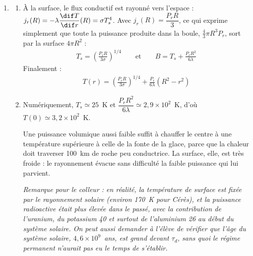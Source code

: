 \begin{correction}
\begin{enumerate}
\begin{enumerate}
	\item On néglige alors $\partial T/\partial t$ :
	\begin{align*}
		\frac{1}{r^2}\frac{\dif }{\dif r}\left( r^2\frac{\dif T}{\dif r}\right) = -\frac{\kappa}{D}=-\frac{P_r}{\lambda}
	\end{align*}
	En intégrant une première fois, $r^2\dfrac{\dif T}{\dif r}=-\dfrac{P_r}{3\lambda}r^3+A$, puis :
	\begin{align*}
		T(r) = -\frac{P_r}{6\lambda}r^2-\frac{A}{r}+B
	\end{align*}
	La température doit rester finie au centre, donc $A=0$. Autre argument : le flux sortant d'une petite sphère de rayon $r$ vaut $4\pi r^2j_r=\frac{4}{3}\pi r^3P_r-4\pi\lambda A$, et doit tendre vers 0 avec le volume de la sphère.

\end{enumerate}

\item

\begin{enumerate}

	\item À la surface, le flux conductif est rayonné vers l'espace : $j_r(R)=-\lambda\dfrac{\dif T}{\dif r}(R)=\sigma T_s^4$. Avec $j_r(R)=\dfrac{P_rR}{3}$, ce qui exprime simplement que toute la puissance produite dans la boule, $\frac{4}{3}\pi R^3P_r$, sort par la surface $4\pi R^2$ :
	\begin{align*}
		T_s=\left(\frac{P_rR}{3\sigma}\right)^{1/4} \qquad\text{et}\qquad B=T_s+\frac{P_rR^2}{6\lambda}
	\end{align*}
	Finalement :
	\begin{align*}
		\boxed{T(r) =\left(\frac{P_rR}{3\sigma}\right)^{1/4}+\frac{P_r}{6\lambda}\left( R^2 - r^2\right)}
	\end{align*}

	\item Numériquement, $T_s\simeq25$~K et $\dfrac{P_rR^2}{6\lambda}\simeq2{,}9\times10^{2}$~K, d'où $T(0)\simeq3{,}2\times10^{2}$~K.

	Une puissance volumique aussi faible suffit à chauffer le centre à une température supérieure à celle de la fonte de la glace, parce que la chaleur doit traverser 100~km de roche peu conductrice. La surface, elle, est très froide : le rayonnement évacue sans difficulté la faible puissance qui lui parvient.

	\textit{Remarque pour le colleur : en réalité, la température de surface est fixée par le rayonnement solaire (environ 170~K pour Cérès), et la puissance radioactive était plus élevée dans le passé, avec la contribution de l'uranium, du potassium 40 et surtout de l'aluminium 26 au début du système solaire. On peut aussi demander à l'élève de vérifier que l'âge du système solaire, $4{,}6\times10^{9}$~ans, est grand devant $\tau_d$, sans quoi le régime permanent n'aurait pas eu le temps de s'établir.}

\end{enumerate}

\end{enumerate}

\end{correction}
